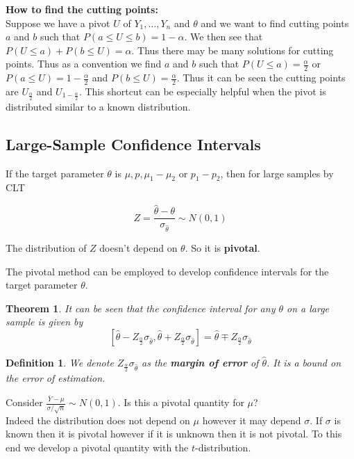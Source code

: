 \documentclass[a4paper,12pt]{article}
\theoremstyle{nonitalic}
\newtheorem{definition}{Definition}[subsection]
\newtheorem{theorem}{Theorem}[subsection]
\begin{document}
    \bigskip

    \textbf{How to find the cutting points:}\\
    Suppose we have a pivot $U$ of $Y_1, \ldots, Y_n$ and $\theta$ and we want to find cutting points $a$ and $b$ such that $P(a \leq U \leq b) = 1 - \alpha$. We then see that $P(U \leq a) + P(b \leq U) = \alpha$. Thus there may be many solutions for cutting points. Thus as a convention we find $a$ and $b$ such that $P(U \leq a) = \frac{\alpha}{2}$ or $P(a \leq U) = 1 - \frac{\alpha}{2}$ and $P(b \leq U) = \frac{\alpha}{2}$. Thus it can be seen the cutting points are $U_{\frac{\alpha}{2}}$ and $U_{1 - \frac{\alpha}{2}}$. This shortcut can be especially helpful when the pivot is distributed similar to a known distribution.

    \newpage

    \subsection{Large-Sample Confidence Intervals}

    If the target parameter \(\theta\) is \(\mu, p, \mu_1 - \mu_2\) or \(p_1 - p_2\), then for large samples by CLT
        
    \[
        Z = \frac{\hat{\theta} - \theta}{\sigma_{\hat{\theta}}} \sim N(0, 1)
    \]
        
    The distribution of \(Z\) doesn’t depend on \(\theta\). So it is \textbf{pivotal}.
        
    The pivotal method can be employed to develop confidence intervals for the target parameter \(\theta\).

    \begin{theorem}
        It can be seen that the confidence interval for any $\theta$ on a large sample is given by
    \[
        \left[\hat{\theta} - Z_{\frac{\alpha}{2}} \sigma_{\hat{\theta}} , \hat{\theta} + Z_{\frac{\alpha}{2}} \sigma_{\hat{\theta}}\right] = \hat{\theta} \mp Z_{\frac{\alpha}{2}} \sigma_{\hat{\theta}}
    \]
    \end{theorem}

    \begin{definition}
        We denote $Z_{\frac{\alpha}{2}} \sigma_{\hat{\theta}}$ as the \textbf{margin of error} of $\hat{\theta}$. It is a bound on the error of estimation.
    \end{definition}

    \bigskip

    Consider $\frac{\overline{Y} - \mu}{\sigma / \sqrt{n}} \sim N(0, 1)$. Is this a pivotal quantity for $\mu$?\\
    Indeed the distribution does not depend on $\mu$ however it may depend $\sigma$. If $\sigma$ is known then it is pivotal however if it is unknown then it is not pivotal. To this end we develop a pivotal quantity with the $t$-distribution.
\end{document}
